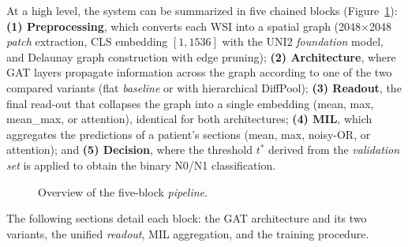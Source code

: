 \documentclass[10pt,a4paper,twocolumn,twoside]{article}
\begin{document}
At a high level, the system can be summarized in five chained blocks
(Figure~\ref{fig:pipeline-overview}): \textbf{(1) Preprocessing}, which converts each WSI into
a spatial graph (2048$\times$2048 \textit{patch} extraction, CLS embedding $[1, 1536]$ with the
UNI2 \textit{foundation} model, and Delaunay graph construction with edge pruning);
\textbf{(2) Architecture}, where GAT layers propagate information across the graph according to one of the
two compared variants (flat \textit{baseline} or with hierarchical DiffPool);
\textbf{(3) Readout}, the final read-out that collapses the graph into a single embedding (mean, max,
mean\_max, or attention), identical for both architectures; \textbf{(4) MIL}, which
aggregates the predictions of a patient's sections (mean, max, noisy-OR, or attention); and
\textbf{(5) Decision}, where the threshold $t^*$ derived from the \textit{validation set} is applied to
obtain the binary N0/N1 classification.

\begin{figure}[h]
\centering
{}
\caption{Overview of the five-block \textit{pipeline}.}
\label{fig:pipeline-overview}
\end{figure}

The following sections detail each block: the GAT architecture and its two variants, the
unified \textit{readout}, MIL aggregation, and the training procedure.
\end{document}
